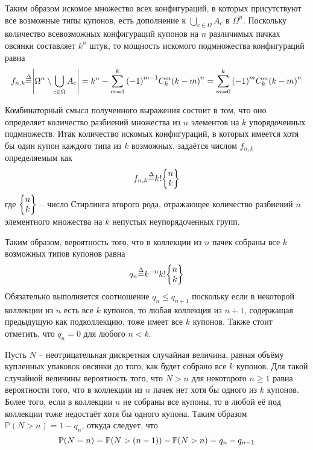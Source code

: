 \documentclass[a4paper]{article}
\let\originalleft\left
\let\originalright\right
\renewcommand{\left}{\mathopen{}\mathclose\bgroup\originalleft}
\renewcommand{\right}{\aftergroup\egroup\originalright}
\newcommand{\obj}[1]{{\left\{ #1 \right \}}}
\newcommand{\brac}[1]{{\left ( #1 \right )}}
\newcommand{\abs}[1]{{\left | #1 \right |}}
\newcommand{\pr}[0]{{\mathbb{P}}}
\newcommand{\defn}{{\mathop{\overset{\Delta}{=}}\nolimits}}
\begin{document}
Таким образом искомое множество всех конфигураций, в которых присутствуют все
возможные типы купонов, есть дополнение к $\bigcup_{c\in \Omega}A_c$ в $\Omega^n$.
Поскольку количество всевозможных конфигураций купонов на $n$ различимых
пачках овсянки составляет $k^n$ штук, то мощность искомого подмножества
конфигураций равна
\[f_{n,k} \defn \abs{\Omega^n\setminus \bigcup_{c\in \Omega}A_c }
= k^n - \sum_{m=1}^k \brac{-1}^{m-1} C^m_k \brac{k - m}^n
= \sum_{m=0}^k \brac{-1}^m C^m_k \brac{k - m}^n \]

Комбинаторный смысл полученного выражения состоит в том, что оно определяет
количество разбиений множества из $n$ элементов на $k$ упорядоченных
подмножеств.
Итак количество искомых конфигураций, в которых имеется хотя бы один купон
каждого типа из $k$ возможных, задаётся числом $f_{n,k}$ определяемым как
\[f_{n,k} \defn  k! \obj{\begin{matrix} n \\ k \end{matrix}}\]
где $\obj{\begin{matrix} n \\ k \end{matrix}}$ -- число Стирлинга второго
рода, отражающее количество разбиений $n$ элементного множества на $k$
непустых неупорядоченных групп.

Таким образом, вероятность того, что в коллекции из $n$ пачек собраны все $k$
возможных типов купонов равна
\[q_n \defn k^{-n} k! \obj{\begin{matrix} n \\ k \end{matrix}}\]
Обязательно выполняется соотношение $q_n\leq q_{n+1}$ поскольку если в
некоторой коллекции из $n$ есть все $k$ купонов, то любая коллекция из $n+1$,
содержащая предыдущую как подколлекцию, тоже имеет все $k$ купонов.
Также стоит отметить, что $q_n = 0$ для любого $n<k$.

Пусть $N$ -- неотрицательная дискретная случайная величина, равная объёму
купленных упаковок овсянки до того, как будет собрано все $k$ купонов.
Для такой случайной величины вероятность того, что $N>n$ для некоторого $n\geq1$
равна вероятности того, что в коллекции из $n$ пачек нет хотя бы одного из $k$
купонов.
Более того, если в коллекции $n$ не собраны все купоны, то в любой её под
коллекции тоже недостаёт хотя бы одного купона.
Таким образом $\pr(N>n) = 1-q_n$, откуда следует, что
\[\pr(N=n) = \pr\brac{N>(n-1)} - \pr(N>n) = q_n - q_{n-1} \]
\end{document}
